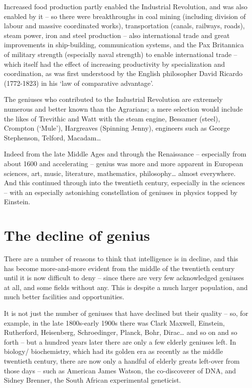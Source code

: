 \documentclass[
]{book}
\begin{document}
Increased food production partly enabled the Industrial Revolution, and was also enabled by it -- so there were breakthroughs in coal mining (including division of labour and massive coordinated works), transportation (canals, railways, roads), steam power, iron and steel production -- also international trade and great improvements in ship-building, communication systems, and the Pax Britannica of military strength (especially naval strength) to enable international trade -- which itself had the effect of increasing productivity by specialization and coordination, as was first understood by the English philosopher David Ricardo (1772-1823) in his `law of comparative advantage'.

The geniuses who contributed to the Industrial Revolution are extremely numerous and better known than the Agrarians; a mere selection would include the likes of Trevithic and Watt with the steam engine, Bessamer (steel), Crompton (`Mule'), Hargreaves (Spinning Jenny), engineers such as George Stephenson, Telford, Macadam\ldots{}

Indeed from the late Middle Ages and through the Renaissance -- especially from about 1600 and accelerating -- genius was more and more apparent in European sciences, art, music, literature, mathematics, philosophy\ldots{} almost everywhere. And this continued through into the twentieth century, especially in the sciences -- with an especially astonishing constellation of geniuses in physics topped by Einstein.

\hypertarget{the-decline-of-genius}{%
\section{The decline of genius}\label{the-decline-of-genius}}

There are a number of reasons to think that intelligence is in decline, and this has become more-and-more evident from the middle of the twentieth century until it is now difficult to deny -- since there are very few acknowledged geniuses at all, and some fields without any. This is despite a much larger population, and much better facilities and opportunities.

It is not just the number of geniuses that have declined but their quality -- so, for example, in the late 1800s-early 1900s there was Clark Maxwell, Einstein, Rutherford, Heisenberg, Schroedinger, Planck, Bohr, Dirac\ldots{} and so on and so forth -- but a hundred years later there are only a few elderly geniuses left. In biology/ biochemistry, which had its golden era as recently as the middle twentieth century, there are now only a handful of elderly greats left-over from those days -- such as American James Watson, the co-discoverer of DNA, and Sidney Brenner, the South African experimental geneticist.
\end{document}

